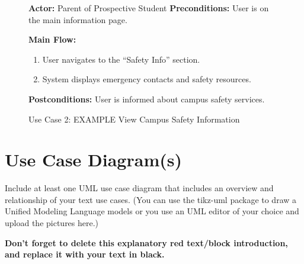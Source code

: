 \vspace{1em}

\begin{figure}[h!]
    \centering
    \begin{tcolorbox}[title=Use Case 2: EXAMPLE View Campus Safety Information]
        \textbf{Actor:} Parent of Prospective Student
        \textbf{Preconditions:} User is on the main information page.

        \textbf{Main Flow:}
        \begin{enumerate}
            \item User navigates to the “Safety Info” section.
            \item System displays emergency contacts and safety resources.
        \end{enumerate}

        \textbf{Postconditions:} User is informed about campus safety services.
    \end{tcolorbox}

    \vspace*{-5pt}
    \caption{Use Case 2:  EXAMPLE View Campus Safety Information}
    \label{fig:usecase2}
\end{figure}

\pagebreak

\section{Use Case Diagram(s)} %

\begin{tcolorbox}[      %
    boxrule=0pt,        %
    colback=white,      %
    coltext=red         %
]                       %
    Include at least one UML use case diagram that includes an overview and relationship of your text use cases.
    \vspace{\baselineskip}
    (You can use the tikz-uml package to draw a Unified Modeling Language models or you use an UML editor of your choice and upload the pictures here.)
    
    \vspace{15pt}       %
    \begin{center}      %
    \textbf{Don't forget to delete this explanatory red text/block introduction, and replace it with your text in black.}
    \end{center}        %
\end{tcolorbox}         %



